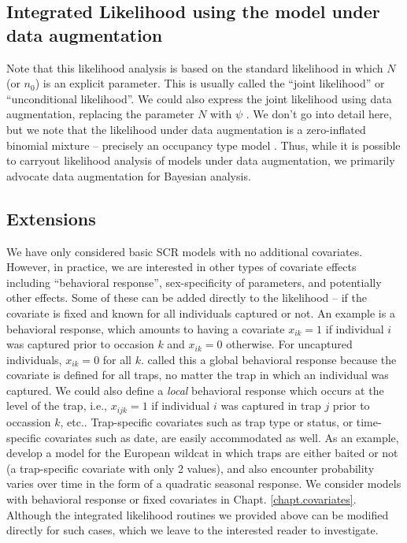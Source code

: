 \subsection{Integrated Likelihood using the model under data augmentation } 

Note that this likelihood analysis is based on the standard likelihood
in which $N$ (or $n_{0}$) is an explicit parameter. This is usually called
the ``joint likelihood'' or ``unconditional likelihood''.  We could also
express the joint likelihood using data augmentation, replacing the
parameter $N$ with $\psi$ \citep[e.g., see Sec. 7.1.6][for an example]{royle_dorazio:2008}.
We don't go into detail here, but we note that the
likelihood under data augmentation is a zero-inflated binomial
mixture – precisely an occupancy type model \citep{royle:2006}.
Thus, while it is possible to carryout likelihood analysis of
models under data augmentation, we primarily advocate data
augmentation for Bayesian analysis.


\subsection{ Extensions}

We have only considered basic SCR models with no additional
covariates. However, in practice, we are interested in other types of
covariate effects including ``behavioral response'', 
sex-specificity of parameters, and potentially other effects. Some of
these  can be added directly to the likelihood – if the covariate is fixed
and known for all individuals captured or not. An example is a
behavioral response, which amounts to having a covariate $x_{ik}=1$ if
individual $i$ was captured prior to occasion $k$ and $x_{ik}=0$
otherwise. For uncaptured individuals, $x_{ik}=0$ for all $k$.
 \citet{royle_etal:2011jwm} called this a global behavioral
response because the covariate is defined for all traps, no matter the
trap in which an individual was captured. We could also define a {\it
  local} behavioral response which occurs at the level of the trap,
i.e., $x_{ijk}=1$ if individual $i$ was captured in trap $j$ prior to
occassion $k$, etc.. 
Trap-specific covariates such as trap type or status, or
time-specific covariates such as date, are easily accommodated as
well. As an example, \citet{kery_etal:2010} develop a model for the
European wildcat in which traps are either baited or not (a
trap-specific covariate with only 2 values), and also encounter
probability varies over time in the form of a quadratic seasonal response.
We consider models with behavioral response or fixed covariates in
Chapt. \ref{chapt.covariates}.
Although the integrated likelihood routines we provided above can be
modified directly for such cases, which we leave to the interested
reader to investigate. 

